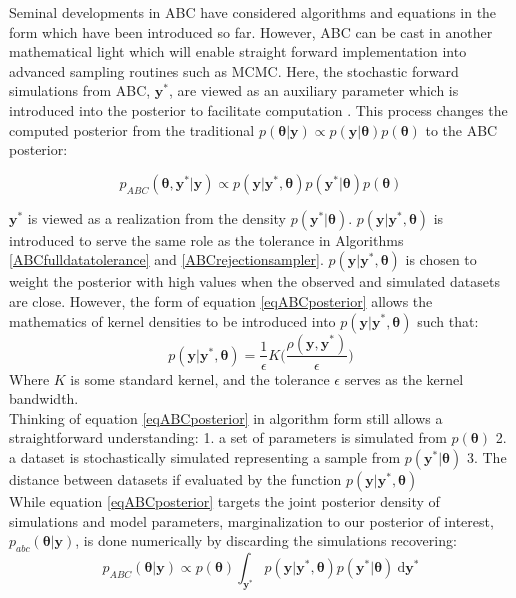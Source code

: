 Seminal developments in ABC have considered algorithms and equations in the form which have been introduced so far. However, ABC can be cast in another mathematical light which will enable straight forward implementation into advanced sampling routines such as MCMC. Here, the stochastic forward simulations from ABC, $\bm{y^*}$, are viewed as an auxiliary parameter which is introduced into the posterior to facilitate computation \citep{Sisson2010a}. This process changes the computed posterior from the traditional $p(\bm{\theta}|\bm{y}) \propto p(\bm{y}|\bm{\theta})p(\bm{\theta})$ to the ABC posterior:

\begin{equation}
p_{ABC}(\bm{\theta},\bm{y^*}|\bm{y}) \propto p(\bm{y}|\bm{y^*},\bm{\theta}) p(\bm{y^*}|\bm{\theta}) p(\bm{\theta})
\label{eqABCposterior}
\end{equation}

$\bm{y^*}$ is viewed as a realization from the density $p(\bm{y^*}|\bm{\theta})$. $p(\bm{y}|\bm{y^*},\bm{\theta})$ is introduced to serve the same role as the tolerance in Algorithms \ref{ABCfulldatatolerance} and \ref{ABCrejectionsampler}. $p(\bm{y}|\bm{y^*},\bm{\theta})$ is chosen to weight the posterior with high values when the observed and simulated datasets are close. However, the form of equation \ref{eqABCposterior} allows the mathematics of kernel densities to be introduced into $p(\bm{y}|\bm{y^*},\bm{\theta})$ such that:
\begin{equation}
p(\bm{y}|\bm{y^*},\bm{\theta}) = \frac{1}{\epsilon} K \Big(\frac{\rho(\bm{y},\bm{y^*})}{\epsilon}\Big)
\end{equation}
Where $K$ is some standard kernel, and the tolerance $\epsilon$ serves as the kernel bandwidth. \\

Thinking of equation \ref{eqABCposterior} in algorithm form still allows a straightforward understanding: 1. a set of parameters is simulated from $p(\bm{\theta})$ 2. a dataset is stochastically simulated representing a sample from $p(\bm{y^*}|\bm{\theta})$ 3. The distance between datasets if evaluated by the function $p(\bm{y}|\bm{y^*},\bm{\theta})$\\

While equation \ref{eqABCposterior} targets the joint posterior density of simulations and model parameters, marginalization to our posterior of interest, $p_{abc}(\bm{\theta}|\bm{y})$, is done numerically by discarding the simulations recovering:
\begin{equation}
p_{ABC}(\bm{\theta}|\bm{y}) \propto p(\bm{\theta}) \int_{\bm{y^*}} p(\bm{y}|\bm{y^*},\bm{\theta}) p(\bm{y^*}|\bm{\theta})\ \text{d}\bm{y^*}
\label{eqABCtargetPosterior}
\end{equation}\\

